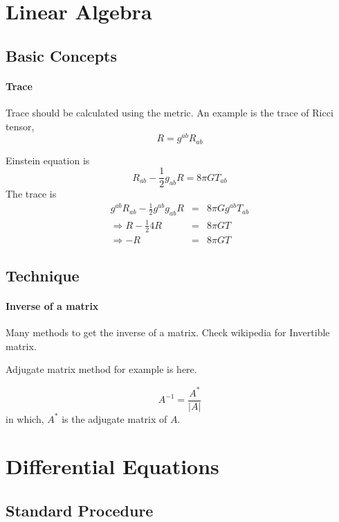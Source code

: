 \documentclass[12pt,a4paper]{book}
\begin{document}
\section{Linear Algebra}

\subsection{Basic Concepts}

\paragraph{Trace}
Trace should be calculated using the metric. An example is the trace of Ricci tensor,
\begin{equation}
R=g^{ab}R_{ab}
\end{equation}

Einstein equation is \begin{equation}
R_{ab}-\frac{1}{2}g_{ab}R=8\pi G T_{ab}
\end{equation}
 The trace is \begin{eqnarray}
g^{ab}R_{ab}-\frac{1}{2}g^{ab}g_{ab}R&=&8\pi G g^{ab}T_{ab} \\
\Rightarrow R-\frac{1}{2} 4 R &=& 8\pi G T \\
\Rightarrow -R&=&8\pi GT
\end{eqnarray}


\subsection{Technique}

\paragraph{Inverse of a matrix}
Many methods to get the inverse of a matrix. Check wikipedia for Invertible matrix.

Adjugate matrix method for example is here.

\begin{equation}
A^{-1} = \frac{A^*}{|A|}
\end{equation}
in which, $A^*$ is the adjugate matrix of $A$.




\section{Differential Equations}

\subsection{Standard Procedure}
\end{document}
